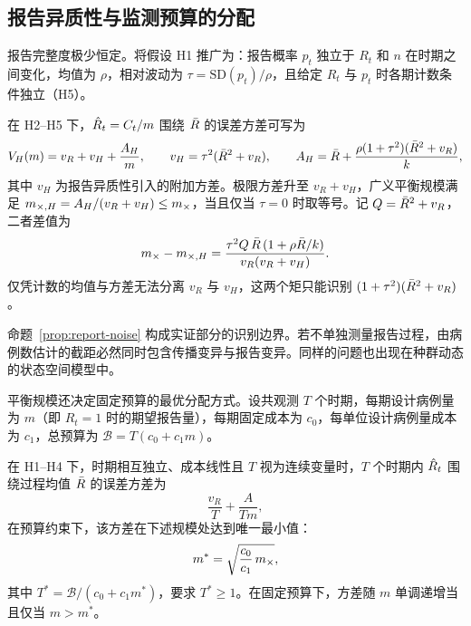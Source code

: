 \subsection{报告异质性与监测预算的分配}
\label{sec:bg-reporting}

报告完整度极少恒定。将假设 H1 推广为：报告概率 $p_t$ 独立于 $R_t$ 和 $n$ 在时期之间变化，均值为 $\rho$，相对波动为 $\tau=\mathrm{SD}(p_t)/\rho$，且给定 $R_t$ 与 $p_t$ 时各期计数条件独立（H5）。

\begin{proposition}[报告异质性]
\label{prop:report-noise}
在 H2--H5 下，$\hat{R}_t=C_t/m$ 围绕 $\bar{R}$ 的误差方差可写为
\begin{equation}
  V_H(m)=v_R+v_H+\frac{A_H}{m},\qquad
  v_H=\tau^2(\bar{R}^2+v_R),\qquad A_H=\bar{R}+\frac{\rho(1+\tau^2)(\bar{R}^2+v_R)}{k},
  \label{eq:vH-AH}
\end{equation}
其中 $v_H$ 为报告异质性引入的附加方差。极限方差升至 $v_R+v_H$，广义平衡规模满足 $m_{\times,H}=A_H/(v_R+v_H)\le m_{\times}$，当且仅当 $\tau=0$ 时取等号。记 $Q=\bar{R}^2+v_R$，二者差值为
\begin{equation}
  m_{\times}-m_{\times,H}=\frac{\tau^2Q\,\bar{R}\,(1+\rho\bar{R}/k)}{v_R(v_R+v_H)}.
  \label{eq:mx-gap}
\end{equation}
仅凭计数的均值与方差无法分离 $v_R$ 与 $v_H$，这两个矩只能识别 $(1+\tau^2)(\bar{R}^2+v_R)$。
\end{proposition}

命题~\ref{prop:report-noise} 构成实证部分的识别边界。若不单独测量报告过程，由病例数估计的截距必然同时包含传播变异与报告变异。同样的问题也出现在种群动态的状态空间模型中\citep{knape2008estimability, augermethe2016state}。

平衡规模还决定固定预算的最优分配方式。设共观测 $T$ 个时期，每期设计病例量为 $m$（即 $R_t=1$ 时的期望报告量），每期固定成本为 $c_0$，每单位设计病例量成本为 $c_1$，总预算为 $\mathcal{B}=T(c_0+c_1m)$。

\begin{proposition}[固定预算的分配]
\label{prop:allocation}
在 H1--H4 下，时期相互独立、成本线性且 $T$ 视为连续变量时，$T$ 个时期内 $\hat{R}_t$ 围绕过程均值 $\bar{R}$ 的误差方差为
\begin{equation}
  \frac{v_R}{T}+\frac{A}{Tm},
  \label{eq:alloc-indep}
\end{equation}
在预算约束下，该方差在下述规模处达到唯一最小值：
\begin{equation}
  m^*=\sqrt{\frac{c_0}{c_1}\,m_{\times}},
  \label{eq:optimal-m}
\end{equation}
其中 $T^*=\mathcal{B}/(c_0+c_1m^*)$，要求 $T^*\ge1$。在固定预算下，方差随 $m$ 单调递增当且仅当 $m>m^*$。
\end{proposition}

